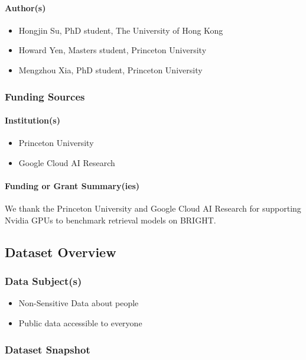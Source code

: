 \paragraph{Author(s)}
\begin{itemize}
    \item Hongjin Su, PhD student, The University of Hong Kong
    \item Howard Yen, Masters student, Princeton University
    \item Mengzhou Xia, PhD student, Princeton University
\end{itemize}

\subsubsection{Funding Sources}

\paragraph{Institution(s)}
\begin{itemize}
    \item Princeton University
    \item Google Cloud AI Research
\end{itemize}

\paragraph{Funding or Grant Summary(ies)}
We thank the Princeton University and Google Cloud AI Research for supporting Nvidia GPUs to benchmark retrieval models on BRIGHT.

\subsection{Dataset Overview}

\subsubsection{Data Subject(s)}
\begin{itemize}
    \item Non-Sensitive Data about people
    \item Public data accessible to everyone
\end{itemize}

\subsubsection{Dataset Snapshot}

